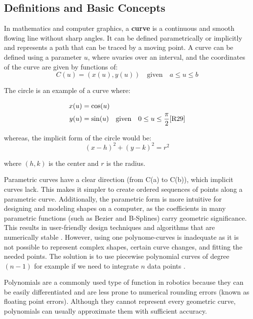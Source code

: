 \subsection{Definitions and Basic Concepts}

In mathematics and computer graphics, a \textbf{curve} is a continuous and smooth flowing line without sharp angles. 
It can be defined parametrically or implicitly and represents a path that can be traced by a moving point.
A curve can be defined using a parameter 
\(u\), where \(u\)varies over an interval, and the coordinates of the curve are given by functions of:
\begin{equation}
    C(u) = (x(u), y(u)) \quad \text{given} \quad a \leq u \leq b \label{eq:curve}
\end{equation}

The circle is an example of a curve where:

\hspace*{-1cm} %
\begin{align}
    x(u) &= \cos(u) \\
    y(u) &= \sin(u) \quad \text{given} \quad 0 \leq u \leq \frac{\pi}{2}     \cite{R29}
\end{align}

whereas, the implicit form of the circle would be:
\begin{equation}
    (x - h)^2 + (y - k)^2 = r^2
\end{equation}

where \((h,k)\) is the center and \(r\) is the radius.


Parametric curves have a clear direction (from C(a) to C(b)), which implicit curves lack. This makes 
it simpler to create ordered sequences of points along a parametric curve. Additionally, the parametric 
form is more intuitive for designing and modeling shapes on a computer, as the coefficients in many 
parametric functions (such as Bezier and B-Splines) carry geometric significance. This results in 
user-friendly design techniques and algorithms that are numerically stable \cite{R28}. 
However, using one polynome-curves is inadequate as it is not possible to represent complex shapes, certain 
curve changes, and fitting the needed points. 
The solution is to use piecewise polynomial curves of degree \((n-1)\) for example if we need to integrate
\(n\) data points \cite{R29}.

Polynomials are a commonly used type of function in robotics because they can be easily differentiated 
and are less prone to numerical rounding errors (known as floating point errors). Although they cannot 
represent every geometric curve, polynomials can usually approximate them with sufficient accuracy. 

